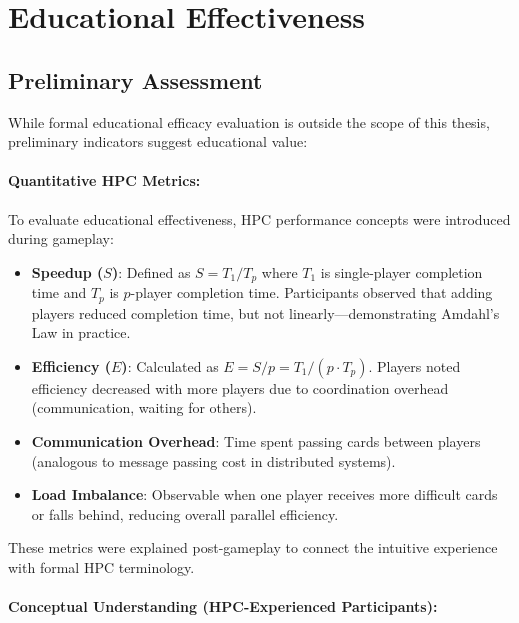 \section{Educational Effectiveness}
\label{sec:educational-effectiveness}

\subsection{Preliminary Assessment}
\label{subsec:preliminary-assessment}

While formal educational efficacy evaluation is outside the scope of this thesis, preliminary indicators suggest educational value:

\paragraph*{Quantitative HPC Metrics:}

To evaluate educational effectiveness, HPC performance concepts were introduced during gameplay:

\begin{itemize}
    \item \textbf{Speedup ($S$)}: Defined as $S = T_1 / T_p$ where $T_1$ is single-player completion time and $T_p$ is $p$-player completion time. Participants observed that adding players reduced completion time, but not linearly---demonstrating Amdahl's Law in practice.
    \item \textbf{Efficiency ($E$)}: Calculated as $E = S / p = T_1 / (p \cdot T_p)$. Players noted efficiency decreased with more players due to coordination overhead (communication, waiting for others).
    \item \textbf{Communication Overhead}: Time spent passing cards between players (analogous to message passing cost in distributed systems).
    \item \textbf{Load Imbalance}: Observable when one player receives more difficult cards or falls behind, reducing overall parallel efficiency.
\end{itemize}

These metrics were explained post-gameplay to connect the intuitive experience with formal HPC terminology.

\paragraph*{Conceptual Understanding (HPC-Experienced Participants):}

